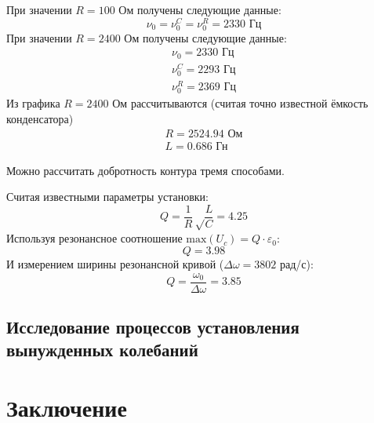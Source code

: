 При значении $R=100$ Ом получены следующие данные:
\begin{equation}
	\nu_0=\nu_0^C=\nu_0^R=2330 \text{ Гц}
\end{equation}
При значении $R=2400$ Ом получены следующие данные:
\begin{gather}
	\nu_0=2330 \text{ Гц}\\
	\nu_0^C=2293 \text{ Гц}\\
	\nu_0^R=2369 \text{ Гц}
\end{gather}
Из графика $R=2400$ Ом рассчитываются (считая точно известной ёмкость конденсатора)
\begin{gather}
	R=2524.94 \text{ Ом}\\
	L=0.686 \text{ Гн}
\end{gather}

Можно рассчитать добротность контура тремя способами.

Считая известными параметры установки:
\begin{equation}
	Q=\frac{1}{R}\sqrt\frac{L}{C}=4.25
\end{equation}
Используя резонансное соотношение $\mathrm{max}(U_c)=Q\cdot \varepsilon_0$:
\begin{equation}
	Q=3.98
\end{equation}
И измерением ширины резонансной кривой ($\Delta\omega=3802$ рад/с):
\begin{equation}
	Q=\frac{\omega_0}{\Delta\omega}=3.85
\end{equation}
\subsection{Исследование процессов установления вынужденных колебаний}


\section{Заключение}

 